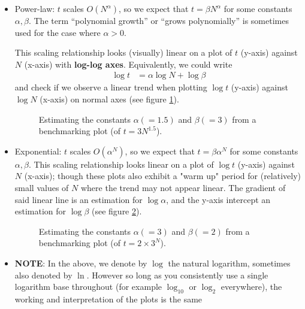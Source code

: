 \begin{itemize}
  \item Power-law: $t$ scales $O(N^\alpha)$, so we expect that $t = \beta N^{\alpha}$ for some constants $\alpha, \beta$.
        The term ``polynomial growth'' or ``grows polynomially'' is sometimes used for the case where $\alpha > 0$.

        This scaling relationship looks (visually) linear on a plot of $t$ (y-axis) against $N$ (x-axis) with \textbf{log-log axes}.
        Equivalently, we could write
        \begin{align*}
          \log t & = \alpha \log N + \log\beta
        \end{align*}
        and check if we observe a linear trend when plotting $\log t$ (y-axis) against $\log N$ (x-axis) on normal axes (see figure \ref{fig:power-law-quantity-estimation}).
        \begin{figure}[h!]
          \centering
          
          \caption{
            \label{fig:power-law-quantity-estimation}
            Estimating the constants $\alpha ( = 1.5)$ and $\beta ( = 3)$ from a benchmarking plot (of $t = 3N^{1.5}$).
          }
        \end{figure}
  \item Exponential: $t$ scales $O(\alpha^N)$, so we expect that $t = \beta \alpha^{N}$ for some constants $\alpha, \beta$.
        This scaling relationship looks linear on a plot of $\log t$ (y-axis) against $N$ (x-axis); though these plots also exhibit a "warm up" period for (relatively) small values of $N$ where the trend may not appear linear.
        The gradient of said linear line is an estimation for $\log \alpha$, and the y-axis intercept an estimation for $\log \beta$ (see figure \ref{fig:exp-law-quantity-estimation}).
        \begin{figure}[h!]
          \centering
          
          \caption{
            \label{fig:exp-law-quantity-estimation}
            Estimating the constants $\alpha (= 3)$ and $\beta (= 2)$ from a benchmarking plot (of $t= 2\times 3^N$).}
        \end{figure}
  \item \textbf{NOTE}: In the above, we denote by $\log$ the natural logarithm, sometimes also denoted by $\ln$.
        However so long as you consistently use a single logarithm base throughout (for example $\log_10$ or $\log_2$ everywhere), the working and interpretation of the plots is the same
\end{itemize}
